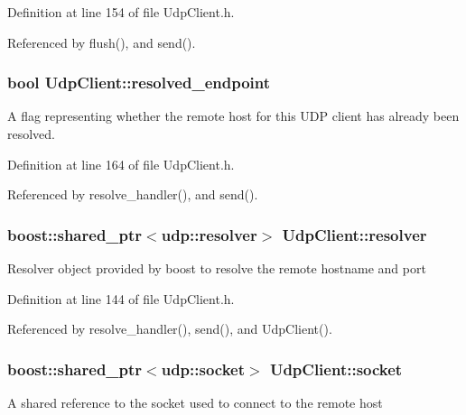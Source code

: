 Definition at line 154 of file UdpClient.h.



Referenced by flush(), and send().

\hypertarget{classUdpClient_a342b58425b4ccaf7de2a3ad8dcbc4df8}{
\subsubsection[{resolved\_\-endpoint}]{\setlength{\rightskip}{0pt plus 5cm}bool {\bf UdpClient::resolved\_\-endpoint}}}
\label{classUdpClient_a342b58425b4ccaf7de2a3ad8dcbc4df8}
A flag representing whether the remote host for this UDP client has already been resolved. 

Definition at line 164 of file UdpClient.h.



Referenced by resolve\_\-handler(), and send().

\hypertarget{classUdpClient_a1ea233a699d5d1955bb3fa4bfca2ee2f}{
\subsubsection[{resolver}]{\setlength{\rightskip}{0pt plus 5cm}boost::shared\_\-ptr$<$udp::resolver$>$ {\bf UdpClient::resolver}}}
\label{classUdpClient_a1ea233a699d5d1955bb3fa4bfca2ee2f}
Resolver object provided by {\ttfamily boost} to resolve the remote hostname and port 

Definition at line 144 of file UdpClient.h.



Referenced by resolve\_\-handler(), send(), and UdpClient().

\hypertarget{classUdpClient_a5e929af056033e7b1fd3f72ad2bd1849}{
\subsubsection[{socket}]{\setlength{\rightskip}{0pt plus 5cm}boost::shared\_\-ptr$<$udp::socket$>$ {\bf UdpClient::socket}}}
\label{classUdpClient_a5e929af056033e7b1fd3f72ad2bd1849}
A shared reference to the socket used to connect to the remote host 

